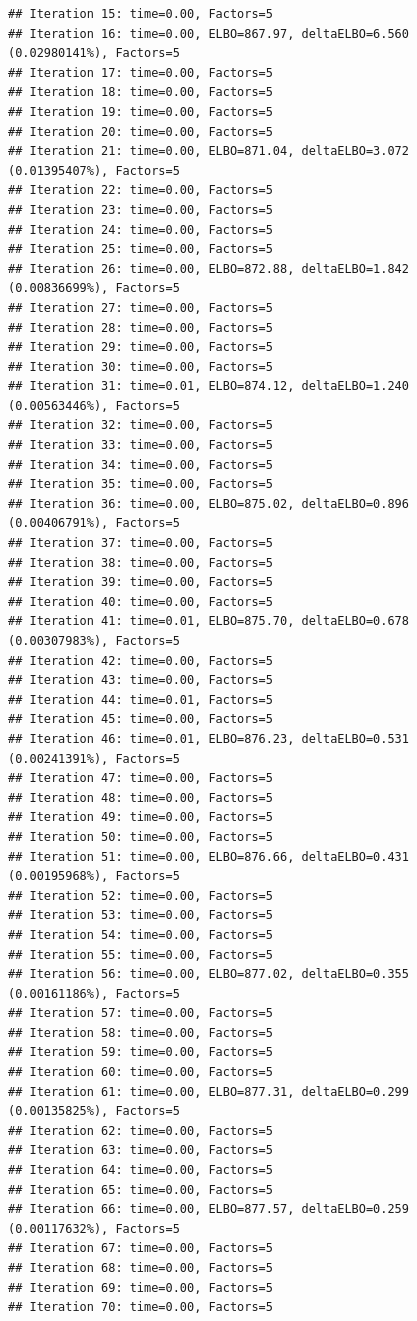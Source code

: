 \documentclass[
]{book}
\begin{document}
\begin{verbatim}
## Iteration 15: time=0.00, Factors=5
## Iteration 16: time=0.00, ELBO=867.97, deltaELBO=6.560 (0.02980141%), Factors=5
## Iteration 17: time=0.00, Factors=5
## Iteration 18: time=0.00, Factors=5
## Iteration 19: time=0.00, Factors=5
## Iteration 20: time=0.00, Factors=5
## Iteration 21: time=0.00, ELBO=871.04, deltaELBO=3.072 (0.01395407%), Factors=5
## Iteration 22: time=0.00, Factors=5
## Iteration 23: time=0.00, Factors=5
## Iteration 24: time=0.00, Factors=5
## Iteration 25: time=0.00, Factors=5
## Iteration 26: time=0.00, ELBO=872.88, deltaELBO=1.842 (0.00836699%), Factors=5
## Iteration 27: time=0.00, Factors=5
## Iteration 28: time=0.00, Factors=5
## Iteration 29: time=0.00, Factors=5
## Iteration 30: time=0.00, Factors=5
## Iteration 31: time=0.01, ELBO=874.12, deltaELBO=1.240 (0.00563446%), Factors=5
## Iteration 32: time=0.00, Factors=5
## Iteration 33: time=0.00, Factors=5
## Iteration 34: time=0.00, Factors=5
## Iteration 35: time=0.00, Factors=5
## Iteration 36: time=0.00, ELBO=875.02, deltaELBO=0.896 (0.00406791%), Factors=5
## Iteration 37: time=0.00, Factors=5
## Iteration 38: time=0.00, Factors=5
## Iteration 39: time=0.00, Factors=5
## Iteration 40: time=0.00, Factors=5
## Iteration 41: time=0.01, ELBO=875.70, deltaELBO=0.678 (0.00307983%), Factors=5
## Iteration 42: time=0.00, Factors=5
## Iteration 43: time=0.00, Factors=5
## Iteration 44: time=0.01, Factors=5
## Iteration 45: time=0.00, Factors=5
## Iteration 46: time=0.01, ELBO=876.23, deltaELBO=0.531 (0.00241391%), Factors=5
## Iteration 47: time=0.00, Factors=5
## Iteration 48: time=0.00, Factors=5
## Iteration 49: time=0.00, Factors=5
## Iteration 50: time=0.00, Factors=5
## Iteration 51: time=0.00, ELBO=876.66, deltaELBO=0.431 (0.00195968%), Factors=5
## Iteration 52: time=0.00, Factors=5
## Iteration 53: time=0.00, Factors=5
## Iteration 54: time=0.00, Factors=5
## Iteration 55: time=0.00, Factors=5
## Iteration 56: time=0.00, ELBO=877.02, deltaELBO=0.355 (0.00161186%), Factors=5
## Iteration 57: time=0.00, Factors=5
## Iteration 58: time=0.00, Factors=5
## Iteration 59: time=0.00, Factors=5
## Iteration 60: time=0.00, Factors=5
## Iteration 61: time=0.00, ELBO=877.31, deltaELBO=0.299 (0.00135825%), Factors=5
## Iteration 62: time=0.00, Factors=5
## Iteration 63: time=0.00, Factors=5
## Iteration 64: time=0.00, Factors=5
## Iteration 65: time=0.00, Factors=5
## Iteration 66: time=0.00, ELBO=877.57, deltaELBO=0.259 (0.00117632%), Factors=5
## Iteration 67: time=0.00, Factors=5
## Iteration 68: time=0.00, Factors=5
## Iteration 69: time=0.00, Factors=5
## Iteration 70: time=0.00, Factors=5

\end{verbatim}
\end{document}
